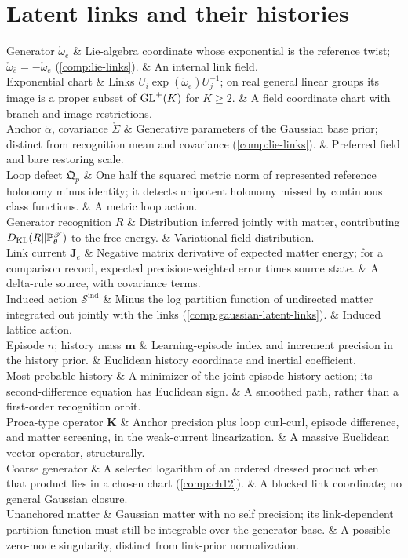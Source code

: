 \section*{Latent links and their histories}

\begin{decoder}
Generator $\mathring\omega_e$ & Lie-algebra coordinate whose exponential is the reference twist; $\mathring\omega_{\bar e}=-\mathring\omega_e$ (\cref{comp:lie-links}). & An internal link field. \\
Exponential chart & Links $U_i\exp(\mathring\omega_e)U_j^{-1}$; on real general linear groups its image is a proper subset of $\mathrm{GL}^+(K)$ for $K\geq2$. & A field coordinate chart with branch and image restrictions. \\
Anchor $\mathring\alpha$, covariance $\mathring\Sigma$ & Generative parameters of the Gaussian base prior; distinct from recognition mean and covariance (\cref{comp:lie-links}). & Preferred field and bare restoring scale. \\
Loop defect $\mathfrak Q_p$ & One half the squared metric norm of represented reference holonomy minus identity; it detects unipotent holonomy missed by continuous class functions. & A metric loop action. \\
Generator recognition $R$ & Distribution inferred jointly with matter, contributing $D_{\mathrm{KL}}(R\Vert\mathbb P^{\mathscr T}_\theta)$ to the free energy. & Variational field distribution. \\
Link current $\mathbf J_e$ & Negative matrix derivative of expected matter energy; for a comparison record, expected precision-weighted error times source state. & A delta-rule source, with covariance terms. \\
Induced action $\mathscr S^{\mathrm{ind}}$ & Minus the log partition function of undirected matter integrated out jointly with the links (\cref{comp:gaussian-latent-links}). & Induced lattice action. \\
Episode $n$; history mass $\mathbf m$ & Learning-episode index and increment precision in the history prior. & Euclidean history coordinate and inertial coefficient. \\
Most probable history & A minimizer of the joint episode-history action; its second-difference equation has Euclidean sign. & A smoothed path, rather than a first-order recognition orbit. \\
Proca-type operator $\mathbf K$ & Anchor precision plus loop curl-curl, episode difference, and matter screening, in the weak-current linearization. & A massive Euclidean vector operator, structurally. \\
Coarse generator & A selected logarithm of an ordered dressed product when that product lies in a chosen chart (\cref{comp:ch12}). & A blocked link coordinate; no general Gaussian closure. \\
Unanchored matter & Gaussian matter with no self precision; its link-dependent partition function must still be integrable over the generator base. & A possible zero-mode singularity, distinct from link-prior normalization. \\
\end{decoder}

